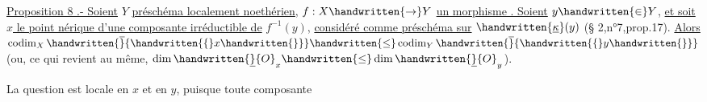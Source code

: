 \uline{Proposition 8 .- Soient}  $Y$\handwritten{,} \uline{  préschéma localement noethérien}, $f:X\handwritten{\to}Y$ \uline{un morphisme . Soient} $y\handwritten{\in}Y$, \uline{et soit $x$ le point nérique d'une composante irréductible de} $f^{-1}(y)$, \uline{considéré comme préschéma sur} $\handwritten{\underline{\kappa}}(y)$ (\S{} 2,n°7,prop.17). \uline{Alors} $\operatorname{codim}_X\handwritten{\overline}{\handwritten{\{}x\handwritten{\}}}\handwritten{\leq}\operatorname{codim}_Y\handwritten{\overline}{\handwritten{\{}y\handwritten{\}}}$ (ou, ce qui revient au même, $\dim\handwritten{\underline}{O}_x\handwritten{\leq}\dim\handwritten{\underline}{O}_y$).

La question est locale en $x$ et en $y$, puisque toute composante
